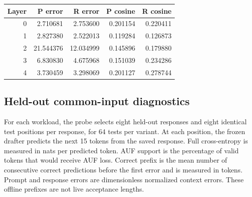 \begin{table}[htbp]
\begin{minipage}[t]{0.48\linewidth}
\begin{tabular}{@{}rrrrr@{}}
\toprule
Layer & P error & R error & P cosine & R cosine \\
\midrule
0 & 2.710681 & 2.753600 & 0.201154 & 0.220411 \\
1 & 2.827380 & 2.522013 & 0.119284 & 0.126873 \\
2 & 21.544376 & 12.034999 & 0.145896 & 0.179880 \\
3 & 6.830830 & 4.675968 & 0.151039 & 0.234286 \\
4 & 3.730459 & 3.298069 & 0.201127 & 0.278744 \\
\bottomrule
\end{tabular}
\end{minipage}
\end{table}

\subsection{Held-out common-input diagnostics}
\label{app:heldout-diagnostics}

For each workload, the probe selects eight held-out responses and eight identical test positions per response, for 64 tests per variant. At each position, the frozen drafter predicts the next 15 tokens from the saved response. Full cross-entropy is measured in nats per predicted token. AUF support is the percentage of valid tokens that would receive AUF loss. Correct prefix is the mean number of consecutive correct predictions before the first error and is measured in tokens. Prompt and response errors are dimensionless normalized context errors. These offline prefixes are not live acceptance lengths.

